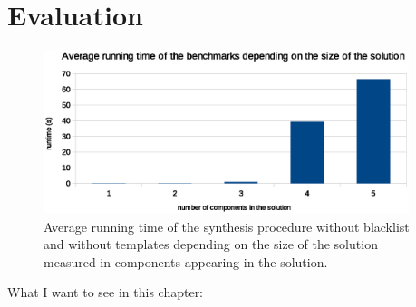 \chapter{Evaluation} \label{evaluation}


\begin{figure}[p]
    \centering
    \includegraphics[width=0.95\textwidth]{nof_comp_vs_runtime.eps}
    \caption{Average running time of the synthesis procedure without blacklist and without templates depending on the size of the solution measured in components appearing in the solution.}
    \label{fig:nof_comp_vs_runtime}
\end{figure}
What I want to see in this chapter:
